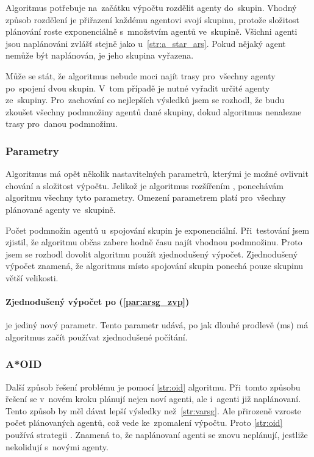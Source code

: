 Algoritmus potřebuje na~začátku výpočtu rozdělit agenty do~skupin.
Vhodný způsob rozdělení je přiřazení každému agentovi svojí skupinu,
protože složitost plánování roste exponenciálně s~množstvím agentů ve~skupině.
Všichni agenti jsou naplánováni zvlášť stejně jako u~\ref{str:a_star_ars}.
Pokud nějaký agent nemůže být naplánován, je jeho skupina vyřazena.

Může se stát, že algoritmus nebude moci najít trasy pro~všechny agenty po~spojení dvou skupin.
V~tom případě je nutné vyřadit určité agenty ze~skupiny.
Pro~zachování co nejlepších výsledků jsem se rozhodl, že budu zkoušet všechny podmnožiny agentů dané skupiny,
dokud algoritmus nenalezne trasy pro~danou podmnožinu.

\subsubsection{Parametry}\label{subsubsec:arsg_parametry}
Algoritmus má opět několik nastavitelných parametrů, kterými je možné ovlivnit chování a složitost výpočtu.
Jelikož je algoritmus rozšířením , ponechávám algoritmu všechny tyto parametry.
Omezení parametrem platí pro~všechny plánované agenty ve~skupině.

Počet podmnožin agentů u~spojování skupin je exponenciální.
Při~testování jsem zjistil, že algoritmu občas zabere hodně času najít vhodnou podmnožinu.
Proto jsem se rozhodl dovolit algoritmu použít zjednodušený výpočet.
Zjednodušený výpočet znamená, že algoritmus místo spojování skupin ponechá pouze skupinu větší velikosti.

\paragraph{Zjednodušený výpočet po (\ref{par:arsg_zvp})} je jediný nový parametr.
Tento parametr udává, po jak dlouhé prodlevě (ms) má algoritmus začít používat zjednodušené počítání.

\subsubsection{A*OID}\label{subsubsec:a_star_aoid}
Další způsob řešení  problému je pomocí \ref{str:oid} algoritmu.
Při~tomto způsobu řešení se v~novém kroku plánují nejen noví agenti, ale i~agenti již naplánovaní.
Tento způsob by měl dávat lepší výsledky než~\ref{str:varsg}.
Ale přirozeně vzroste počet plánovaných agentů, což vede ke~zpomalení výpočtu.
Proto \ref{str:oid} používá strategii .
Znamená to, že naplánovaní agenti se znovu neplánují, jestliže nekolidují s~novými agenty.

